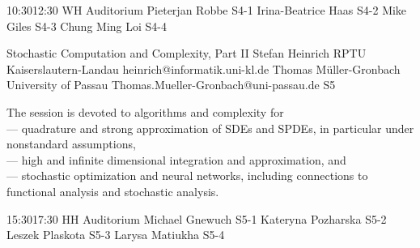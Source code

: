 \documentclass[12pt,lettersize,oneside]{book} %
\begin{document}
\sessionPart{}%
{\hfill{}
{10:30}{12:30} %
{WH Auditorium}} %
{Pieterjan Robbe}
{S4-1}
{Irina-Beatrice Haas}
{S4-2}
{Mike Giles}
{S4-3}
{Chung Ming Loi}
{S4-4}



\clearpage

\begin{session}
 {Stochastic Computation and Complexity, Part II}%
 {Stefan Heinrich}%
 {RPTU Kaiserslautern-Landau}%
 {heinrich@informatik.uni-kl.de}%
 {Thomas M\"uller-Gronbach}%
 {University of Passau}%
 {Thomas.Mueller-Gronbach@uni-passau.de}%
 {S5}%
 {}%

 The session is devoted to algorithms and complexity for\\
 --- quadrature and strong approximation of SDEs and SPDEs, in particular under nonstandard assumptions,\\
 --- high and infinite dimensional integration and approximation, and\\
 --- stochastic optimization and neural networks,
 including connections to functional analysis and stochastic analysis.
\end{session}



\sessionPart{}%
{\hfill{}
{15:30}{17:30} %
{HH Auditorium}} %
{Michael Gnewuch}
{S5-1}
{Kateryna Pozharska}
{S5-2}
{Leszek Plaskota}
{S5-3}
{Larysa Matiukha}
{S5-4}
\end{document}
